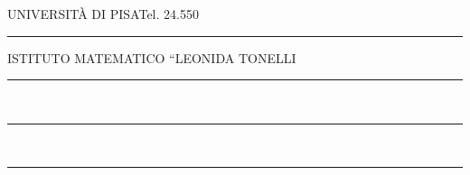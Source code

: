 \noindent UNIVERSITÀ DI PISA\hfill Tel. 24.550

\noindent\hspace{5em}\rule{3em}{0.3pt}

\noindent ISTITUTO MATEMATICO ``LEONIDA TONELLI\quotedblbase

\noindent\hspace{4em}\rule{2.1em}{0.3pt}\,\rule{0.4em}{1.2pt}\,\rule{2.1em}{0.3pt}

